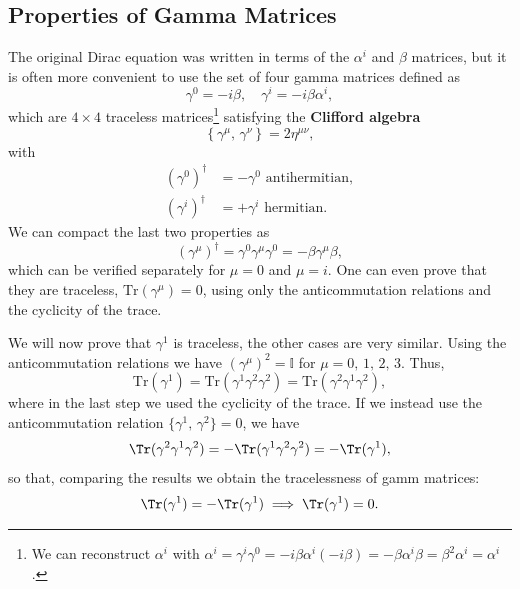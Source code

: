 \subsection{Properties of Gamma Matrices}

The original Dirac equation was written in terms of the \(\alpha^i\) and \(\beta\) matrices, but it is often more convenient to use the set of four gamma matrices defined as
\[
    \gamma^0 = -i \beta, \quad \gamma^i = -i \beta \alpha^i,
\]
which are \(4\times 4\) traceless matrices\footnote{We can reconstruct \(\alpha^i\) with \(\alpha^i = \gamma^i \gamma^0 = -i \beta \alpha^i (-i \beta) = - \beta \alpha^i \beta = \beta^2 \alpha^i = \alpha^i\).} satisfying the \textbf{Clifford algebra}
\[
    \left\{\gamma^{\mu},\, \gamma^{\nu}\right\} = 2 \eta^{\mu \nu},
\]
with
\[
    \begin{aligned}
        \left(\gamma^0\right)^{\dagger} & = - \gamma^0 \text{ antihermitian}, \\
        \left(\gamma^i\right)^{\dagger} & = + \gamma^i \text{ hermitian}.
    \end{aligned}
\]
We can compact the last two properties as
\[
    \left(\gamma^{\mu}\right)^{\dagger} = \gamma^0 \gamma^{\mu} \gamma^0 = -\beta \gamma^{\mu} \beta,
\]
which can be verified separately for \(\mu = 0\) and \(\mu = i\). One can even prove that they are traceless, \(\mathrm{Tr}(\gamma^{\mu}) = 0\), using only the anticommutation relations and the cyclicity of the trace.
\begin{example}
    We will now prove that \(\gamma^1\) is traceless, the other cases are very similar. Using the anticommutation relations we have \((\gamma^{\mu})^2 = \mathbb{I}\) for \(\mu = 0,\,1,\,2,\,3\). Thus,
    \[
        \mathrm{Tr}(\gamma^1) = \mathrm{Tr}(\gamma^1 \gamma^2 \gamma^2) = \mathrm{Tr}(\gamma^2 \gamma^1 \gamma^2),
    \]
    where in the last step we used the cyclicity of the trace. If we instead use the anticommutation relation \(\{\gamma^1,\, \gamma^2\} = 0\), we have
    \[
        \Tr(\gamma^2 \gamma^1 \gamma^2) = - \Tr(\gamma^1 \gamma^2 \gamma^2) = - \Tr(\gamma^1),
    \]
    so that, comparing the results we obtain the tracelessness of gamm matrices:
    \[
        \Tr(\gamma^1) = - \Tr(\gamma^1) \implies \Tr(\gamma^1) = 0.
    \]
\end{example}

